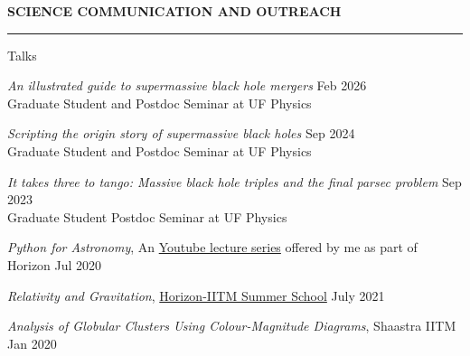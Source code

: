 \documentclass{resume} %
\renewenvironment{rSection}[1]{
\sectionskip
\textbf{\textcolor{C2}{\MakeUppercase{#1}}}
\sectionlineskip
\hrule
\begin{list}{}{
\setlength{\leftmargin}{1.5em}
}
\item[]
}{
\end{list}
}
\begin{document}
\begin{rSection}{Science communication and outreach}
    \begin{rSubsection}{Talks}{}{}{}
    \item \emph{An illustrated guide to supermassive black hole mergers} \hfill Feb 2026 \\ Graduate Student and Postdoc Seminar at UF Physics 
    \item \emph{Scripting the origin story of supermassive black holes} \hfill Sep 2024 \\ Graduate Student and Postdoc Seminar at UF Physics 
    \item \emph{It takes three to tango: Massive black hole triples and the final parsec problem}  \hfill Sep 2023 \\ Graduate Student Postdoc Seminar at UF Physics
     \item \textit{\color{C2} Python for Astronomy}, An \href{https://youtu.be/HfYR0uwYAyM}{Youtube lecture series} offered by me as part of Horizon \hfill Jul 2020
    \item \textit{\color{C2} Relativity and Gravitation}, \href{https://github.com/HorizonIITM/summer-school-2021}{Horizon-IITM Summer School} \hfill July 2021
    \item \textit{\color{C2} Analysis of Globular Clusters Using
    Colour-Magnitude Diagrams}, Shaastra IITM \hfill Jan 2020
    \end{rSubsection}
\end{rSection}
\end{document}
